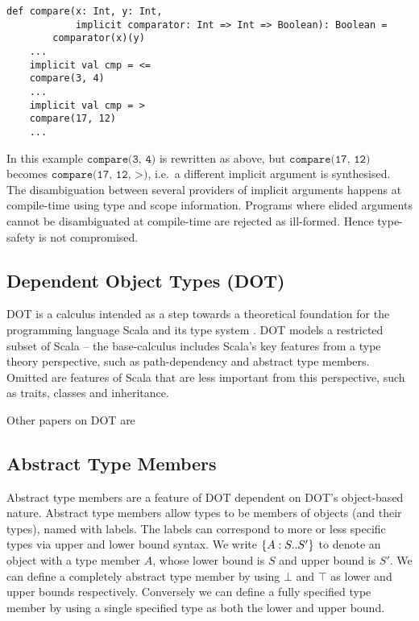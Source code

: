 \begin{minipage}{\linewidth}
\begin{lstlisting}[mathescape]
    def compare(x: Int, y: Int,
            implicit comparator: Int => Int => Boolean): Boolean =
        comparator(x)(y)
    ...
    implicit val cmp = <=
    compare(3, 4)
    ...
    implicit val cmp = >
    compare(17, 12)
    ...
\end{lstlisting}
\end{minipage}

In this example $\texttt{compare(3, 4)}$ is rewritten as above, but
$\texttt{compare(17, 12)}$ becomes $\texttt{compare(17, 12, >)}$, i.e.~a
different implicit argument is synthesised. The disambiguation between several
providers of implicit arguments happens at compile-time using type and scope
information. Programs where elided arguments cannot be disambiguated at
compile-time are rejected as ill-formed. Hence type-safety is not compromised.

\subsection{Dependent Object Types (DOT)}

DOT is a calculus intended as a step towards a theoretical foundation for the
programming language Scala and its type system \cite{AMO12}. DOT models a
restricted subset of Scala -- the base-calculus includes Scala's key features
from a type theory perspective, such as path-dependency and abstract type
members. Omitted are features of Scala that are less important from this
perspective, such as traits, classes and inheritance.

Other papers on DOT are \cite{ARO14, AR17, AR16}

\subsection{Abstract Type Members}

Abstract type members are a feature of DOT dependent on DOT's object-based
nature. Abstract type members allow types to be members of objects (and their
types), named with labels. The labels can correspond to more or less specific
types via upper and lower bound syntax. We write $\{A : S .. S'\}$ to denote an
object with a type member $A$, whose lower bound is $S$ and upper bound is
$S'$. We can define a completely abstract type member by using $\bot$ and
$\top$ as lower and upper bounds respectively. Conversely we can define a fully
specified type member by using a single specified type as both the lower and
upper bound.

